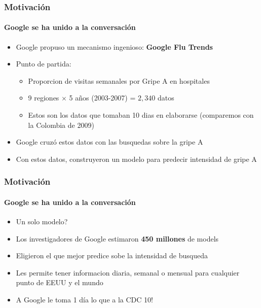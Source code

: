\documentclass[
  shownotes,
  xcolor={svgnames},
  hyperref={colorlinks,citecolor=DarkBlue,linkcolor=DarkRed,urlcolor=DarkBlue}
  , aspectratio=169]{beamer}
\begin{document}

\begin{frame}
\frametitle{Motivación}
\framesubtitle{Google se ha unido a la conversación}

\begin{itemize}
  \item Google propuso un mecanismo ingenioso: {\bf Google Flu Trends}
  \bigskip
  \item Punto de partida: 
  \begin{itemize}
    \item Proporcion de visitas semanales por Gripe A en hospitales 
    \item 9 regiones $\times$ 5 años (2003-2007) = $2,340$ datos
    \item Estos son los datos que tomaban 10 dias en elaborarse (comparemos con la Colombia de 2009)
  \end{itemize}
  \bigskip
  \item Google cruzó estos datos con las busquedas sobre la gripe A
  \bigskip
  \item Con estos datos, construyeron un modelo para predecir intensidad de gripe A  
\end{itemize}  

\end{frame}


\begin{frame}
\frametitle{Motivación}
\framesubtitle{Google se ha unido a la conversación}

\begin{itemize}
  \item Un solo modelo?
  \bigskip
  \item Los investigadores de Google estimaron {\bf 450 millones} de models
  \bigskip
  \item Eligieron el que mejor predice sobe la intensidad de busqueda
  \bigskip
  \item Les permite tener informacion diaria, semanal o mensual para cualquier punto de EEUU y el mundo
  \bigskip
  \item A Google le toma 1 día lo que a la CDC 10!
\end{itemize}  
\end{frame}



\end{document}
